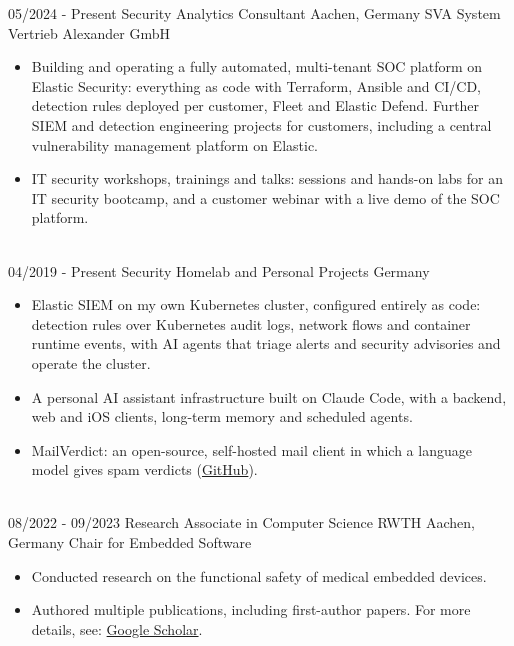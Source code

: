 \begin{twenty}
    \twentyitem
        {05/2024 -}
        {Present}
        {Security Analytics Consultant}
        {Aachen, Germany}
        {SVA System Vertrieb Alexander GmbH}
        {\begin{itemize}
            \item Building and operating a fully automated, multi-tenant SOC platform on Elastic Security: everything as code with Terraform, Ansible and CI/CD, detection rules deployed per customer, Fleet and Elastic Defend. Further SIEM and detection engineering projects for customers, including a central vulnerability management platform on Elastic.
            \item IT security workshops, trainings and talks: sessions and hands-on labs for an IT security bootcamp, and a customer webinar with a live demo of the SOC platform.
        \end{itemize}}
        \\
    \twentyitem
        {04/2019 -}
        {Present}
        {Security Homelab and Personal Projects}
        {Germany}
        {}
        {\begin{itemize}
            \item Elastic SIEM on my own Kubernetes cluster, configured entirely as code: detection rules over Kubernetes audit logs, network flows and container runtime events, with AI agents that triage alerts and security advisories and operate the cluster.
            \item A personal AI assistant infrastructure built on Claude Code, with a backend, web and iOS clients, long-term memory and scheduled agents.
            \item MailVerdict: an open-source, self-hosted mail client in which a language model gives spam verdicts (\href{https://github.com/frederikb96/mail-verdict}{GitHub}).
        \end{itemize}}
        \\
    \twentyitem
        {08/2022 -}
        {09/2023}
        {Research Associate in Computer Science}
        {RWTH Aachen, Germany}
        {Chair for Embedded Software}
        {\begin{itemize}
            \item Conducted research on the functional safety of medical embedded devices.
            \item Authored multiple publications, including first-author papers. For more details, see: \href{https://scholar.google.com/citations?user=cmAmnmcAAAAJ}{Google Scholar}.

\end{itemize}}
\end{twenty}
